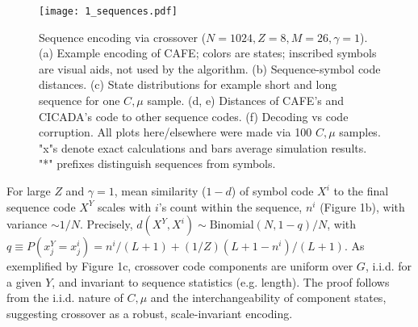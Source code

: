 \documentclass{article}
\begin{document}
\begin{figure}
  \centering
  \texttt{[image: 1\_sequences.pdf]}
  \caption{Sequence encoding via crossover ($N=1024, Z=8, M=26, \gamma=1$). (a) Example encoding of CAFE; colors are states; inscribed symbols are visual aids, not used by the algorithm. (b) Sequence-symbol code distances. (c) State distributions for example short and long sequence for one $C, \mu$ sample. (d, e) Distances of CAFE's and CICADA's code to other sequence codes. (f) Decoding vs code corruption. All plots here/elsewhere were made via 100 $C, \mu$ samples. "x"s denote exact calculations and bars average simulation results. "*" prefixes distinguish sequences from symbols.}
  \label{fig:1}
\end{figure}

For large $Z$ and $\gamma = 1$, mean similarity ($1-d$) of symbol code $X^i$ to the final sequence code $X^Y$ scales with $i$'s count within the sequence, $n^i$ (Figure 1b), with variance $\sim 1/N$. Precisely, $d(X^Y, X^i) \sim \textrm{Binomial}(N, 1-q)/N$, with $q \equiv P(x^Y_j = x^i_j) = n^i/(L+1) + (1/Z)(L+1-n^i)/(L+1)$. As exemplified by Figure 1c, crossover code components are uniform over $G$, i.i.d. for a given $Y$, and invariant to sequence statistics (e.g. length). The proof follows from the i.i.d. nature of $C, \mu$ and the interchangeability of component states, suggesting crossover as a robust, scale-invariant encoding.
\end{document}
